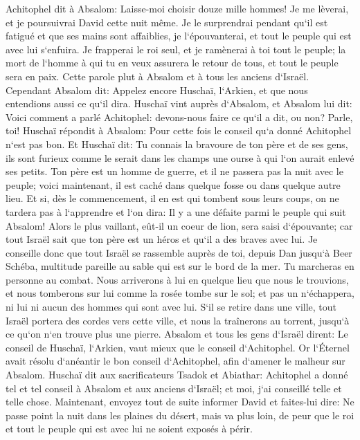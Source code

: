 \verse Achitophel dit à Absalom: Laisse-moi choisir douze mille hommes! Je me lèverai, et je poursuivrai David cette nuit même. 
\verse Je le surprendrai pendant qu`il est fatigué et que ses mains sont affaiblies, je l`épouvanterai, et tout le peuple qui est avec lui s`enfuira. Je frapperai le roi seul, 
\verse et je ramènerai à toi tout le peuple; la mort de l`homme à qui tu en veux assurera le retour de tous, et tout le peuple sera en paix. 
\verse Cette parole plut à Absalom et à tous les anciens d`Israël. 
\verse Cependant Absalom dit: Appelez encore Huschaï, l`Arkien, et que nous entendions aussi ce qu`il dira. 
\verse Huschaï vint auprès d`Absalom, et Absalom lui dit: Voici comment a parlé Achitophel: devons-nous faire ce qu`il a dit, ou non? Parle, toi! 
\verse Huschaï répondit à Absalom: Pour cette fois le conseil qu`a donné Achitophel n`est pas bon. 
\verse Et Huschaï dit: Tu connais la bravoure de ton père et de ses gens, ils sont furieux comme le serait dans les champs une ourse à qui l`on aurait enlevé ses petits. Ton père est un homme de guerre, et il ne passera pas la nuit avec le peuple; 
\verse voici maintenant, il est caché dans quelque fosse ou dans quelque autre lieu. Et si, dès le commencement, il en est qui tombent sous leurs coups, on ne tardera pas à l`apprendre et l`on dira: Il y a une défaite parmi le peuple qui suit Absalom! 
\verse Alors le plus vaillant, eût-il un coeur de lion, sera saisi d`épouvante; car tout Israël sait que ton père est un héros et qu`il a des braves avec lui. 
\verse Je conseille donc que tout Israël se rassemble auprès de toi, depuis Dan jusqu`à Beer Schéba, multitude pareille au sable qui est sur le bord de la mer. Tu marcheras en personne au combat. 
\verse Nous arriverons à lui en quelque lieu que nous le trouvions, et nous tomberons sur lui comme la rosée tombe sur le sol; et pas un n`échappera, ni lui ni aucun des hommes qui sont avec lui. 
\verse S`il se retire dans une ville, tout Israël portera des cordes vers cette ville, et nous la traînerons au torrent, jusqu`à ce qu`on n`en trouve plus une pierre. 
\verse Absalom et tous les gens d`Israël dirent: Le conseil de Huschaï, l`Arkien, vaut mieux que le conseil d`Achitophel. Or l`Éternel avait résolu d`anéantir le bon conseil d`Achitophel, afin d`amener le malheur sur Absalom. 
\verse Huschaï dit aux sacrificateurs Tsadok et Abiathar: Achitophel a donné tel et tel conseil à Absalom et aux anciens d`Israël; et moi, j`ai conseillé telle et telle chose. 
\verse Maintenant, envoyez tout de suite informer David et faites-lui dire: Ne passe point la nuit dans les plaines du désert, mais va plus loin, de peur que le roi et tout le peuple qui est avec lui ne soient exposés à périr. 
